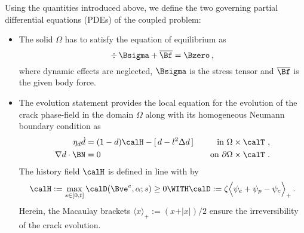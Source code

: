\documentclass[final,3p,times]{elsarticle}
\begin{document}
Using the quantities introduced above, we define the two governing partial differential equations (PDEs) of the coupled problem:
%
\begin{mdframed}
\begin{itemize}
    \item The solid $\Omega$ has to satisfy the equation of equilibrium as
\begin{equation}
{
\div\,\Bsigma + \overline\Bf = \Bzero\,,
}
\end{equation}
where dynamic effects are neglected, $\Bsigma$ is the stress tensor and $\overline\Bf$ is the given body force.
\item The evolution statement
 provides the local equation for the
evolution of the crack phase-field in the domain $\Omega$ along with its homogeneous Neumann boundary condition as
\begin{equation}
\begin{aligned}
\eta_d \dot{d}
&= 
(1-d) {\calH} 
-
[ \, d - l^2 \Delta d \, ] \quad & \mbox{in}~\Omega\times\calT \ ,
\\
\nabla d \cdot \BN &= 0
\quad & \mbox{on} ~ \partial\Omega\times\calT \ .
\end{aligned}
\label{phase-field}
\end{equation}
The history field $\calH$ is defined in line with \cite{miehe+aldakheel+raina16,miehe+kienle+aldakheel+teichtmeister16} by
%
\begin{equation}
\calH := \max_{s\in [0,t]} \calD(\Bve^e,\alpha ; s) \ge 0
\WITH
\calD := \zeta \Big< {\psi}_e + {\psi}_{p} - \psi_c \Big>_+\,.
\label{history-field}
\end{equation}
%
Herein, the Macaulay brackets $\langle x \rangle_+ := (x + \vert x\vert)/2$ ensure the irreversibility of the crack evolution.
\end{itemize}
\end{mdframed}
\end{document}
